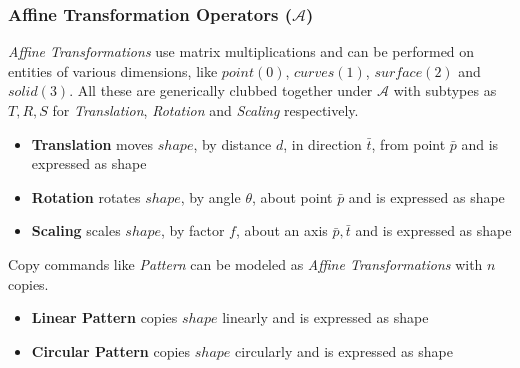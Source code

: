 
\subsubsection{Affine Transformation Operators ($\mathcal{A}$)}

{\em Affine Transformations} use matrix multiplications and can be performed on entities of various dimensions, like $point (0)$, $curves(1)$, $surface(2)$ and $solid(3)$. All these are generically clubbed together under {\bf $\mathcal{A}$} with subtypes as $T,R,S$ for {\em Translation}, {\em Rotation} and {\em Scaling} respectively.


\begin{itemize}[noitemsep,topsep=2pt,parsep=2pt,partopsep=2pt,label={},leftmargin=*]
\item {\bf Translation} moves $shape$, by distance $d$, in direction $\bar{t}$, from point $\bar{p}$ and is expressed as 	 {shape}
\item{\bf Rotation} rotates $shape$, by angle $\theta$, about point $\bar{p}$ and is expressed as 	 {shape}	
\item {\bf Scaling} scales $shape$, by factor  $f$, about an axis $\bar{p},\bar{t}$ and is expressed as 	 {shape}		
\end{itemize}

Copy commands like {\em Pattern} can be modeled as {\em Affine Transformations} with $n$ copies.

\begin{itemize}[noitemsep,topsep=2pt,parsep=2pt,partopsep=2pt,label={},leftmargin=*]
\item {\bf Linear Pattern} copies $shape$ linearly and is expressed as  {shape} 
\item {\bf Circular Pattern} copies $shape$ circularly and is expressed as  {shape} 
\end{itemize}

